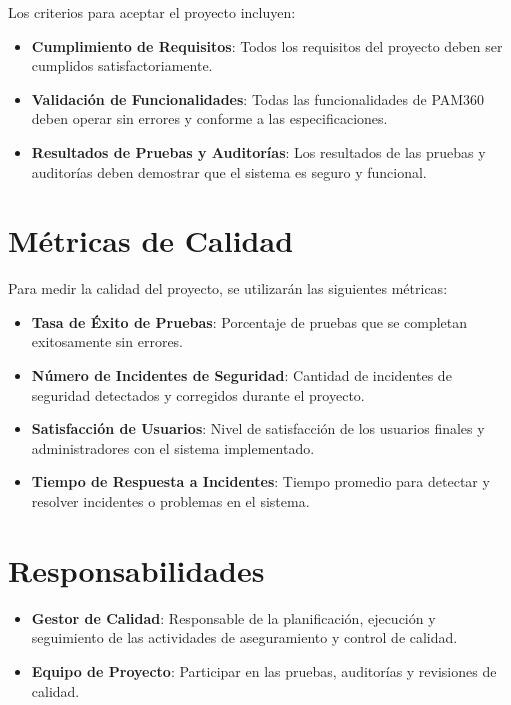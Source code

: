 Los criterios para aceptar el proyecto incluyen:

\begin{itemize}
	\item \textbf{Cumplimiento de Requisitos}: Todos los requisitos del proyecto deben ser cumplidos satisfactoriamente.
	\item \textbf{Validación de Funcionalidades}: Todas las funcionalidades de PAM360 deben operar sin errores y conforme a las especificaciones.
	\item \textbf{Resultados de Pruebas y Auditorías}: Los resultados de las pruebas y auditorías deben demostrar que el sistema es seguro y funcional.
\end{itemize}

\section{Métricas de Calidad}

Para medir la calidad del proyecto, se utilizarán las siguientes métricas:

\begin{itemize}
	\item \textbf{Tasa de Éxito de Pruebas}: Porcentaje de pruebas que se completan exitosamente sin errores.
	\item \textbf{Número de Incidentes de Seguridad}: Cantidad de incidentes de seguridad detectados y corregidos durante el proyecto.
	\item \textbf{Satisfacción de Usuarios}: Nivel de satisfacción de los usuarios finales y administradores con el sistema implementado.
	\item \textbf{Tiempo de Respuesta a Incidentes}: Tiempo promedio para detectar y resolver incidentes o problemas en el sistema.
\end{itemize}

\section{Responsabilidades}

\begin{itemize}
	\item \textbf{Gestor de Calidad}: Responsable de la planificación, ejecución y seguimiento de las actividades de aseguramiento y control de calidad.
	\item \textbf{Equipo de Proyecto}: Participar en las pruebas, auditorías y revisiones de calidad.
\end{itemize}

